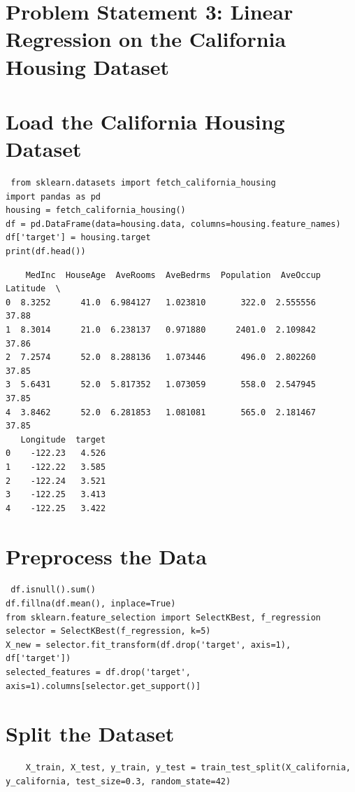\section*{Problem Statement 3: Linear Regression on the California Housing Dataset}
\section{ Load the California Housing Dataset}
\begin{lstlisting}
 from sklearn.datasets import fetch_california_housing 
import pandas as pd
housing = fetch_california_housing() 
df = pd.DataFrame(data=housing.data, columns=housing.feature_names) 
df['target'] = housing.target 
print(df.head()) 
\end{lstlisting}
\begin{verbatim}
    MedInc  HouseAge  AveRooms  AveBedrms  Population  AveOccup  Latitude  \ 
0  8.3252      41.0  6.984127   1.023810       322.0  2.555556     37.88    
1  8.3014      21.0  6.238137   0.971880      2401.0  2.109842     37.86    
2  7.2574      52.0  8.288136   1.073446       496.0  2.802260     37.85    
3  5.6431      52.0  5.817352   1.073059       558.0  2.547945     37.85    
4  3.8462      52.0  6.281853   1.081081       565.0  2.181467     37.85    
   Longitude  target   
0    -122.23   4.526   
1    -122.22   3.585   
2    -122.24   3.521   
3    -122.25   3.413   
4    -122.25   3.422   
\end{verbatim}
\section{Preprocess the Data}
\begin{lstlisting}
 df.isnull().sum() 
df.fillna(df.mean(), inplace=True) 
from sklearn.feature_selection import SelectKBest, f_regression 
selector = SelectKBest(f_regression, k=5)  
X_new = selector.fit_transform(df.drop('target', axis=1), df['target']) 
selected_features = df.drop('target', axis=1).columns[selector.get_support()] 
\end{lstlisting}
\section{Split the Dataset}
\begin{lstlisting}
    X_train, X_test, y_train, y_test = train_test_split(X_california, y_california, test_size=0.3, random_state=42)
\end{lstlisting}

